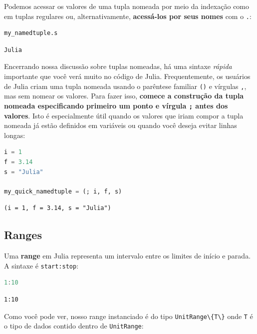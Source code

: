 \documentclass[
  notoc %
]{tufte-book}
\newcommand{\passthrough}[1]{#1}
\begin{document}
Podemos acessar os valores de uma tupla nomeada por meio da indexação
como em tuplas regulares ou, alternativamente, \textbf{acessá-los por
seus nomes} com o \passthrough{\lstinline!.!}:

\begin{lstlisting}[language=Julia]
my_namedtuple.s
\end{lstlisting}

\begin{lstlisting}[language=Output]
Julia
\end{lstlisting}

Encerrando nossa discussão sobre tuplas nomeadas, há uma sintaxe
\emph{rápida} importante que você verá muito no código de Julia.
Frequentemente, os usuários de Julia criam uma tupla nomeada usando o
parêntese familiar \passthrough{\lstinline!()!} e vírgulas
\passthrough{\lstinline!,!}, mas sem nomear os valores. Para fazer isso,
\textbf{comece a construção da tupla nomeada especificando primeiro um
ponto e vírgula \passthrough{\lstinline!;!} antes dos valores}. Isto é
especialmente útil quando os valores que iriam compor a tupla nomeada já
estão definidos em variáveis ou quando você deseja evitar linhas longas:

\begin{lstlisting}[language=Julia]
i = 1
f = 3.14
s = "Julia"

my_quick_namedtuple = (; i, f, s)
\end{lstlisting}

\begin{lstlisting}[language=Output]
(i = 1, f = 3.14, s = "Julia")
\end{lstlisting}

\hypertarget{sec:ranges}{%
\subsection{Ranges}\label{sec:ranges}}

Uma \textbf{range} em Julia representa um intervalo entre os limites de
início e parada. A sintaxe é \passthrough{\lstinline!start:stop!}:

\begin{lstlisting}[language=Julia]
1:10
\end{lstlisting}

\begin{lstlisting}[language=Output]
1:10
\end{lstlisting}

Como você pode ver, nosso range instanciado é do tipo
\passthrough{\lstinline!UnitRange\{T\}!} onde
\passthrough{\lstinline!T!} é o tipo de dados contido dentro de
\passthrough{\lstinline!UnitRange!}:
\end{document}
